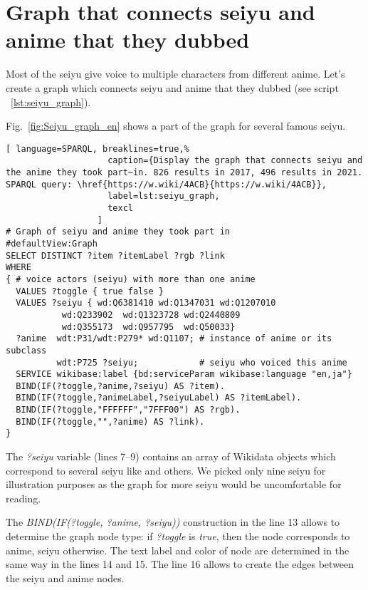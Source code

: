 \section{Graph that connects seiyu and anime that they dubbed}

Most of the seiyu give voice to multiple characters from different anime. Let's create a graph which connects seiyu and anime that they dubbed (see script ~\ref{lst:seiyu_graph}).

Fig.~\ref{fig:Seiyu_graph_en} shows a part of the graph for several famous seiyu.

\begin{widepar}%
\captionsetup[lstlisting]{format=llapwide18}%
%
\begin{lstlisting}[ language=SPARQL, breaklines=true,%
                    caption={Display the graph that connects seiyu and the anime they took part~in. 826 results in 2017, 496 results in 2021. SPARQL query: \href{https://w.wiki/4ACB}{https://w.wiki/4ACB}},
                    label=lst:seiyu_graph,
                    texcl
                  ]
# Graph of seiyu and anime they took part in
#defaultView:Graph
SELECT DISTINCT ?item ?itemLabel ?rgb ?link
WHERE
{ # voice actors (seiyu) with more than one anime
  VALUES ?toggle { true false }
  VALUES ?seiyu { wd:Q6381410 wd:Q1347031 wd:Q1207010 
           wd:Q233902  wd:Q1323728 wd:Q2440809 
           wd:Q355173  wd:Q957795  wd:Q50033}
  ?anime  wdt:P31/wdt:P279* wd:Q1107; # instance of anime or its subclass
          wdt:P725 ?seiyu;            # seiyu who voiced this anime 
  SERVICE wikibase:label {bd:serviceParam wikibase:language "en,ja"}
  BIND(IF(?toggle,?anime,?seiyu) AS ?item).
  BIND(IF(?toggle,?animeLabel,?seiyuLabel) AS ?itemLabel).
  BIND(IF(?toggle,"FFFFFF","7FFF00") AS ?rgb).
  BIND(IF(?toggle,"",?anime) AS ?link).
}
\end{lstlisting}%
\end{widepar}%

The \emph{?seiyu} variable (lines 7--9) contains an array of Wikidata objects which correspond to several seiyu like  and others. We picked only nine seiyu for illustration purposes as the graph for more seiyu would be uncomfortable for reading.

The \emph{BIND(IF(?toggle, ?anime, ?seiyu))} construction in the line \num{13} allows to determine the graph node type: if \emph{?toggle} is \emph{true}, then the node corresponds to anime, seiyu otherwise. The text label and color of node are determined in the same way in the lines \num{14} and \num{15}. The line \num{16} allows to create the edges between the seiyu and anime nodes.

\begin{figure*}

    \setlength{\fboxsep}{0pt}%
    \setlength{\fboxrule}{1pt}%
	\caption[Part of graph that connects seiyu and the anime they took part in, 2021.]{Part of graph that connects seiyu and the anime they took part in, 2021. The graph is constructed using the output of script~\ref{lst:seiyu_graph}.}%
    \label{fig:Seiyu_graph_en}%
\end{figure*} 
